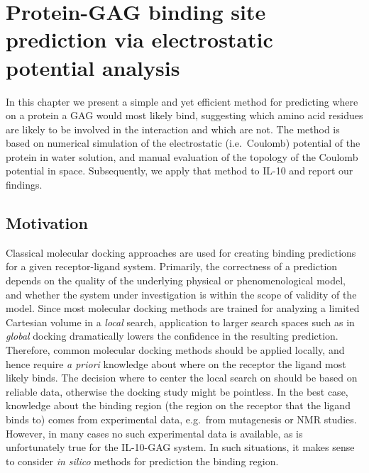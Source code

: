 \chapter{Protein-GAG binding site prediction via electrostatic potential analysis}
\label{chapter:bspred}

In this chapter we present a simple and yet efficient method for predicting
where on a protein a GAG would most likely bind, suggesting which amino acid
residues are likely to be involved in the interaction and which are not. The
method is based on numerical simulation of the electrostatic (i.e.\ Coulomb)
potential of the protein in water solution, and manual evaluation of the
topology of the Coulomb potential in space. Subsequently, we apply that method
to IL-10 and report our findings.

\section{Motivation}
\label{bspred:motivation}

Classical molecular docking approaches are used for creating binding predictions
for a given receptor-ligand system. Primarily, the correctness of a prediction
depends on the quality of the underlying physical or phenomenological model, and
whether the system under investigation is within the scope of validity of the
model. Since most molecular docking methods are trained for analyzing a limited
Cartesian volume in a \textit{local} search, application to larger search spaces
such as in \textit{global} docking dramatically lowers the confidence in the
resulting prediction. Therefore, common molecular docking methods should be
applied locally, and hence require \textit{a priori} knowledge about where on
the receptor the ligand most likely binds. The decision where to center the
local search on should be based on reliable data, otherwise the docking study
might be pointless. In the best case, knowledge about the binding region (the
region on the receptor that the ligand binds to) comes from experimental data,
e.g.\ from mutagenesis or NMR studies. However, in many cases no such
experimental data is available, as is unfortunately true for the IL-10-GAG
system. In such situations, it makes sense to consider \textit{in silico}
methods for prediction the binding region.

